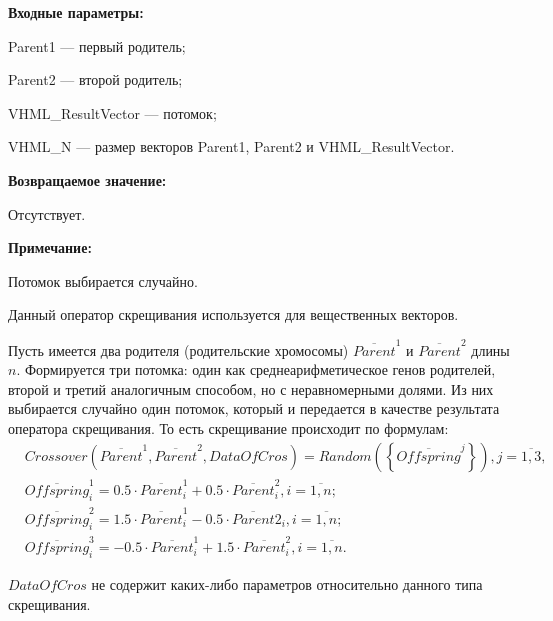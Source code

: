 \textbf{Входные параметры:}
 
Parent1 --- первый родитель;
 
Parent2 --- второй родитель;
 
VHML\_ResultVector --- потомок;
 
VHML\_N --- размер векторов Parent1, Parent2 и VHML\_ResultVector.

\textbf{Возвращаемое значение:}

 Отсутствует.
 
\textbf{ Примечание:}

 Потомок выбирается случайно.
 
Данный оператор скрещивания используется для вещественных векторов.

Пусть имеется два родителя (родительские хромосомы) $ \overline{Parent}^1 $ и $ \overline{Parent}^2$ длины $n$. Формируется три потомка: один как среднеарифметическое генов родителей, второй и третий аналогичным способом, но с неравномерными долями.  Из них выбирается случайно один потомок, который и передается в качестве результата оператора скрещивания. То есть скрещивание происходит по формулам:
\begin{align}
\label{SetOfOperatorsAlgorithms:eq:LinearCrossoverForReal}
&Crossover \left( \overline{Parent}^1, \overline{Parent}^2, DataOfCros\right)=Random \left(\left\lbrace \overline{Offspring}^j\right\rbrace  \right), j=\overline{1,3}, \\
& \overline{Offspring}^1_i=0.5\cdot\overline{Parent}^1_i+0.5\cdot\overline{Parent}^2_i , i=\overline{1,n};\nonumber\\
&\overline{Offspring}^2_i=1.5\cdot\overline{Parent}^1_i-0.5\cdot\overline{Parent}2_i , i=\overline{1,n};\nonumber\\
&\overline{Offspring}^3_i=-0.5\cdot\overline{Parent}^1_i+1.5\cdot\overline{Parent}^2_i , i=\overline{1,n}.\nonumber
\end{align}

$ DataOfCros $ не содержит каких-либо параметров относительно данного типа скрещивания.